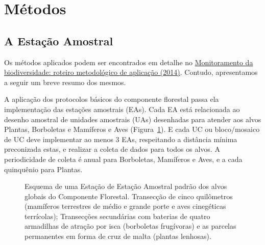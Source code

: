 \documentclass[
  letterpaper,
]{scrbook}
\begin{document}
\section{Métodos}\label{muxe9todos}

\subsection{A Estação Amostral}\label{a-estauxe7uxe3o-amostral}

Os métodos aplicados podem ser encontrados em detalhe no
\href{https://www.gov.br/icmbio/pt-br/assuntos/monitoramento/conteudo/Protocolos-de-Monitoramento/monitoramento_da_biodiversidade_roteiro_metodologico_de_aplicacao_1.pdf}{Monitoramento
da biodiversidade: roteiro metodológico de aplicação (2014)}. Contudo,
apresentamos a seguir um breve resumo dos mesmos.

A aplicação dos protocolos básicos do componente florestal passa ela
implementação das estações amostrais (EAs). Cada EA está relacionada ao
desenho amostral de unidades amostrais (UAs) desenhadas para atender aos
alvos Plantas, Borboletas e Mamíferos e Aves
(Figura~\ref{fig-esquema-estacao-amostral}). E cada UC ou bloco/mosaico
de UC deve implementar ao menos 3 EAs, respeitando a distância mínima
preconizada estas, e realizar a coleta de dados para todos os alvos. A
periodicidade de coleta é anual para Borboletas, Mamíferos e Aves, e a
cada quinquênio para Plantas.

\begin{figure}[H]


\caption{\label{fig-esquema-estacao-amostral}Esquema de uma Estação de
Estação Amostral padrão dos alvos globais do Componente Florestal.
Transecção de cinco quilômetros (mamíferos terrestres de médio e grande
porte e aves cinegéticas terrícolas); Transecções secundárias com
baterias de quatro armadilhas de atração por isca (borboletas
frugívoras) e as parcelas permanentes em forma de cruz de malta (plantas
lenhosas).}

\end{figure}%
\end{document}
